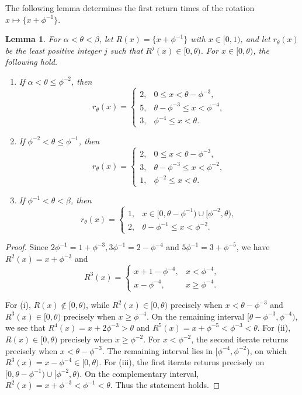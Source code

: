 \documentclass[11pt]{amsart}
\newtheorem{lemma}[theorem]{Lemma}
\theoremstyle{definition}
\begin{document}
The following lemma determines the first return times of the rotation $x\mapsto\{x+\phi^{-1}\}$.
\begin{lemma}\label{lem:return-map}
For $\alpha<\theta<\beta$, let $R(x)=\{x+\phi^{-1}\}$ with $x\in[0,1)$, and let $r_\theta(x)$ be the least positive integer $j$ such that $R^j(x)\in[0,\theta)$. For $x\in[0,\theta)$, the following hold.
\begin{enumerate}
\item[(i)] If $\alpha<\theta\leq\phi^{-2}$, then
\[
r_\theta(x)=
\begin{cases}
2,&0\leq x<\theta-\phi^{-3},\\
5,&\theta-\phi^{-3}\leq x<\phi^{-4},\\
3,&\phi^{-4}\leq x<\theta.
\end{cases}
\]

\item[(ii)] If $\phi^{-2}<\theta\leq\phi^{-1}$, then
\[
r_\theta(x)=
\begin{cases}
2,&0\leq x<\theta-\phi^{-3},\\
3,&\theta-\phi^{-3}\leq x<\phi^{-2},\\
1,&\phi^{-2}\leq x<\theta.
\end{cases}
\]

\item[(iii)] If $\phi^{-1}<\theta<\beta$, then
\[
r_\theta(x)=
\begin{cases}
1,&x\in[0,\theta-\phi^{-1})\cup[\phi^{-2},\theta),\\
2,&\theta-\phi^{-1}\leq x<\phi^{-2}.
\end{cases}
\]
\end{enumerate}
\end{lemma}
\begin{proof}
Since $2\phi^{-1}=1+\phi^{-3}, 3\phi^{-1}=2-\phi^{-4}$ and $5\phi^{-1}=3+\phi^{-5}$,
we have $R^2(x)=x+\phi^{-3}$ and
\[R^3(x)=
\begin{cases}
x+1-\phi^{-4},&x<\phi^{-4},\\
x-\phi^{-4},&x\geq\phi^{-4}.
\end{cases}
\]

For {\rm (i)}, $R(x)\notin[0,\theta)$, while $R^2(x)\in[0,\theta)$ precisely when $x<\theta-\phi^{-3}$ and $R^3(x)\in[0,\theta)$ precisely when $x\geq\phi^{-4}$. On the remaining interval $[\theta-\phi^{-3},\phi^{-4})$,  we see that $R^4(x)=x+2\phi^{-3}>\theta$ and $R^5(x)=x+\phi^{-5}<\phi^{-3}<\theta$. For {\rm (ii)}, $R(x)\in[0,\theta)$ precisely when $x\geq\phi^{-2}$. For $x<\phi^{-2}$, the second iterate returns precisely when $x<\theta-\phi^{-3}$. The remaining interval lies in $[\phi^{-4},\phi^{-2})$, on which $R^3(x)=x-\phi^{-4}\in[0,\theta)$. For {\rm (iii)}, the first iterate returns precisely on $[0,\theta-\phi^{-1})\cup[\phi^{-2},\theta)$. On the complementary interval,
$R^2(x)=x+\phi^{-3}<\phi^{-1}<\theta$. Thus the statement holds.
\end{proof}
\end{document}
